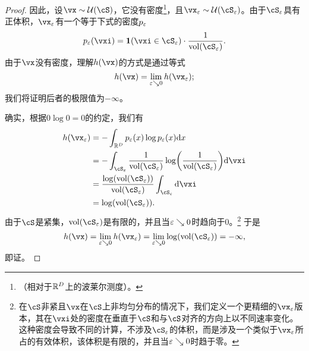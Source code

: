 \documentclass[../../book-main.tex]{subfiles}
\begin{document}
\begin{proof}
    因此，设\(\vx \sim \dUnif(\cS)\)，它没有密度\footnote{（相对于\(\mathbb{R}^{D}\)上的波莱尔测度）。}，且\(\vx_{\eps} \sim \dUnif(\cS_{\eps})\)。由于\(\cS_{\eps}\)具有正体积，\(\vx_{\eps}\)有一个等于下式的密度\(p_{\varepsilon}\)
    \begin{equation}
        p_{\eps}(\vxi) = \indvar(\vxi \in \cS_{\eps}) \cdot \frac{1}{\volume(\cS_{\eps})}.
    \end{equation}
    由于\(\vx\)没有密度，理解\(h(\vx)\)的方式是通过等式
    \begin{equation}
        h(\vx) = \lim_{\eps \searrow 0}h(\vx_{\eps});
    \end{equation}
    我们将证明后者的极限值为\(-\infty\)。

    确实，根据\(0 \log 0 = 0\)的约定，我们有
    \begin{align}
        h(\vx_{\eps}) 
        &= -\int_{\R^{D}}p_{\eps}(x)\log p_{\eps}(x)\odif{x} \\ 
        &= -\int_{\cS_{\eps}}\frac{1}{\volume(\cS_{\eps})} \log\rp{\frac{1}{\volume(\cS_{\eps})}}\odif{\vxi} \\ 
        &= \frac{\log(\volume(\cS_{\eps}))}{\volume(\cS_{\eps})}\int_{\cS_{\eps}}\odif{\vxi} \\ 
        &= \log(\volume(\cS_{\eps})).
    \end{align}
    由于\(\cS\)是紧集，\(\volume(\cS_{\eps})\)是有限的，并且当\(\varepsilon \searrow 0\)时趋向于\(0\)。\footnote{在\(\cS\)非紧且\(\vx\)在\(\cS\)上非均匀分布的情况下，我们定义一个更精细的\(\vx_{\eps}\)版本，其在\(\vxi\)处的密度在垂直于\(\cS\)和与\(\cS\)对齐的方向上以不同速率变化。这种密度会导致不同的计算，不涉及\(\cS_{\eps}\)的体积，而是涉及一个类似于\(\vx_{\eps}\)所占的有效体积，该体积是有限的，并且当\(\varepsilon \searrow 0\)时趋于零。} 于是
    \begin{equation}
        h(\vx) = \lim_{\eps \searrow 0}h(\vx_{\eps}) = \lim_{\eps \searrow 0}\log(\volume(\cS_{\eps})) = -\infty,
    \end{equation}
    即证。
\end{proof}
\end{document}
